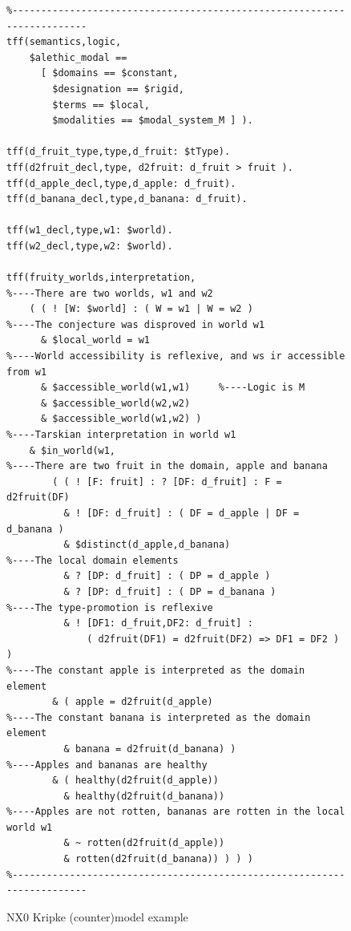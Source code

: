 \documentclass{ceurart}
\begin{document}
\begin{figure}[h!]
\small
{}
\begin{verbatim}
%------------------------------------------------------------------------
tff(semantics,logic,
    $alethic_modal ==
      [ $domains == $constant,
        $designation == $rigid,
        $terms == $local,
        $modalities == $modal_system_M ] ).

tff(d_fruit_type,type,d_fruit: $tType).
tff(d2fruit_decl,type, d2fruit: d_fruit > fruit ).
tff(d_apple_decl,type,d_apple: d_fruit).
tff(d_banana_decl,type,d_banana: d_fruit).

tff(w1_decl,type,w1: $world).
tff(w2_decl,type,w2: $world).

tff(fruity_worlds,interpretation,
%----There are two worlds, w1 and w2
    ( ( ! [W: $world] : ( W = w1 | W = w2 )
%----The conjecture was disproved in world w1
      & $local_world = w1
%----World accessibility is reflexive, and ws ir accessible from w1
      & $accessible_world(w1,w1)     %----Logic is M
      & $accessible_world(w2,w2)
      & $accessible_world(w1,w2) )
%----Tarskian interpretation in world w1
    & $in_world(w1,
%----There are two fruit in the domain, apple and banana
        ( ( ! [F: fruit] : ? [DF: d_fruit] : F = d2fruit(DF)
          & ! [DF: d_fruit] : ( DF = d_apple | DF = d_banana )
          & $distinct(d_apple,d_banana)
%----The local domain elements
          & ? [DP: d_fruit] : ( DP = d_apple )
          & ? [DP: d_fruit] : ( DP = d_banana )
%----The type-promotion is reflexive
          & ! [DF1: d_fruit,DF2: d_fruit] :
              ( d2fruit(DF1) = d2fruit(DF2) => DF1 = DF2 ) )
%----The constant apple is interpreted as the domain element
        & ( apple = d2fruit(d_apple)
%----The constant banana is interpreted as the domain element
          & banana = d2fruit(d_banana) )
%----Apples and bananas are healthy
        & ( healthy(d2fruit(d_apple))
          & healthy(d2fruit(d_banana))
%----Apples are not rotten, bananas are rotten in the local world w1
          & ~ rotten(d2fruit(d_apple))
          & rotten(d2fruit(d_banana)) ) ) )
%------------------------------------------------------------------------
\end{verbatim}
\caption{NX0 Kripke (counter)model example}
\label{NX0Kripke}
\end{figure}
\end{document}
